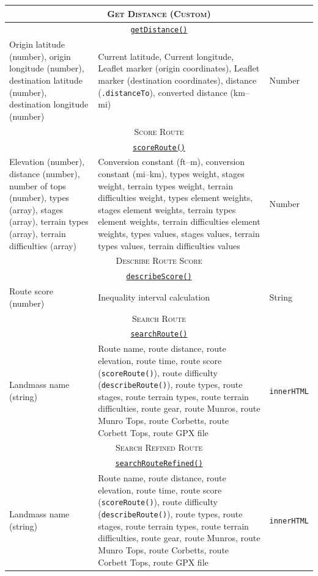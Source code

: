 \documentclass[11pt, english]{article}
\begin{document}
\begin{center}
\begin{longtable}{p{4cm}p{6cm}p{2cm}}
		\hline
		\multicolumn{3}{c}{\textsc{Get Distance (Custom)}}\\
		\hline
		\multicolumn{3}{c}{\underline{\texttt{getDistance()}}}\\
		Origin latitude (number), origin longitude (number), destination latitude (number), destination longitude (number) & Current latitude, Current longitude, Leaflet marker (origin coordinates), Leaflet marker (destination coordinates), distance (\texttt{.distanceTo}), converted distance (km--mi) & Number\\
		\hline
		\multicolumn{3}{c}{\textsc{Score Route}}\\
		\hline
		\multicolumn{3}{c}{\underline{\texttt{scoreRoute()}}}\\
		Elevation (number), distance (number), number of tops (number), types (array), stages (array), terrain types (array), terrain difficulties (array) & Conversion constant (ft--m), conversion constant (mi--km), types weight, stages weight, terrain types weight, terrain difficulties weight, types element weights, stages element weights, terrain types element weights, terrain difficulties element weights, types values, stages values, terrain types values, terrain difficulties values & Number\\
		\hline
		\multicolumn{3}{c}{\textsc{Describe Route Score}}\\
		\hline
		\multicolumn{3}{c}{\underline{\texttt{describeScore()}}}\\
		Route score (number) & Inequality interval calculation & String\\
		\hline
		\multicolumn{3}{c}{\textsc{Search Route}}\\
		\hline
		\multicolumn{3}{c}{\underline{\texttt{searchRoute()}}}\\
		Landmass name (string) & Route name, route distance, route elevation, route time, route score (\texttt{scoreRoute()}), route difficulty (\texttt{describeRoute()}), route types, route stages, route terrain types, route terrain difficulties, route gear, route Munros, route Munro Tops, route Corbetts, route Corbett Tops, route GPX file & \texttt{innerHTML}\\
		\hline
		\multicolumn{3}{c}{\textsc{Search Refined Route}}\\
		\hline
		\multicolumn{3}{c}{\underline{\texttt{searchRouteRefined()}}}\\
		Landmass name (string) & Route name, route distance, route elevation, route time, route score (\texttt{scoreRoute()}), route difficulty (\texttt{describeRoute()}), route types, route stages, route terrain types, route terrain difficulties, route gear, route Munros, route Munro Tops, route Corbetts, route Corbett Tops, route GPX file & \texttt{innerHTML}\\

\end{longtable}
\end{center}
\end{document}
